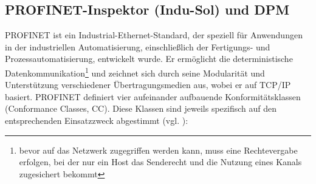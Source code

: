 \subsection{PROFINET-Inspektor (Indu-Sol) und DPM}

PROFINET ist ein Industrial-Ethernet-Standard, der speziell für Anwendungen in der industriellen Automatisierung, einschließlich der Fertigungs- und Prozessautomatisierung, entwickelt wurde. Er ermöglicht die deterministische Datenkommunikation\footnote{bevor auf das Netzwerk zugegriffen werden kann, muss eine Rechtevergabe erfolgen, bei der nur ein Host das Senderecht und die Nutzung eines Kanals zugesichert bekommt} und zeichnet sich durch seine Modularität und Unterstützung verschiedener Übertragungsmedien aus, wobei er auf TCP/IP basiert. PROFINET definiert vier aufeinander aufbauende Konformitätsklassen (Conformance Classes, CC). Diese Klassen sind jeweils spezifisch auf den entsprechenden Einsatzzweck abgestimmt (vgl. \cite{IPInsider}):


